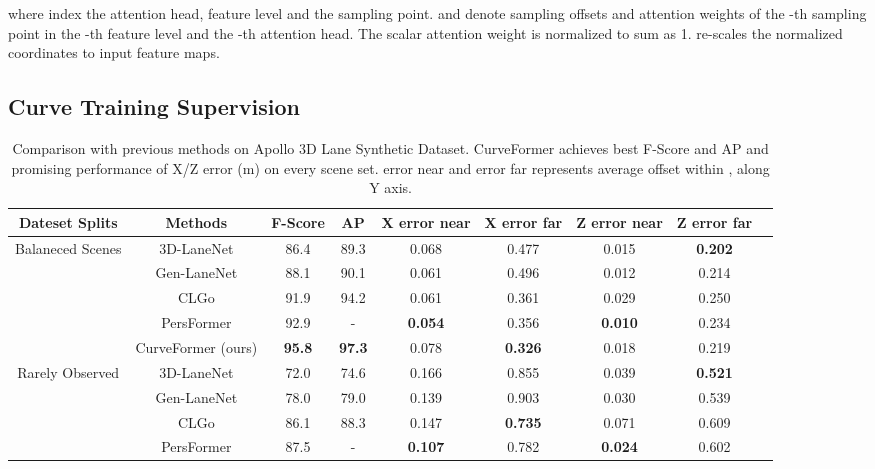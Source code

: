 \documentclass[letterpaper, 10 pt, conference]{ieeeconf}
\begin{document}
where  index the attention head, feature level and the sampling point.  and  denote sampling offsets and attention weights of the -th sampling point in the -th feature level and the -th attention head. The scalar attention weight  is normalized to sum as 1.  re-scales the normalized coordinates to input feature maps.


\subsection{Curve Training Supervision}


\begin{table*}[t]
\centering
\begin{scriptsize}
    \caption{Comparison with previous methods on Apollo 3D Lane Synthetic Dataset. CurveFormer achieves best F-Score and AP and promising performance of X/Z error (m) on every scene set. error near and error far represents average offset within ,  along Y axis.}
    \label{tab:results-apollosim}
    \begin{tabular}{c|c|ccccccc}
    \toprule
    Dateset Splits & Methods & F-Score & AP & X error near & X error far & Z error near & Z error far \\
      \midrule
      \multicolumn{1}{c|}{\multirow{5}{5em}{Balaneced Scenes}}
     & 3D-LaneNet\cite{garnett20193d}   & 86.4 & 89.3 & 0.068 & 0.477 & 0.015 &  \textbf{0.202} \\
     & Gen-LaneNet\cite{guo2020gen}  & 88.1 & 90.1 & 0.061 & 0.496 & 0.012 & 0.214 \\
     & CLGo\cite{liu2022learning}         & 91.9 & 94.2 & 0.061 & 0.361 & 0.029 & 0.250 \\
     & PersFormer\cite{chen2022persformer}   & 92.9 & - &  \textbf{0.054} & 0.356 &  \textbf{0.010} & 0.234 \\
     & CurveFormer (ours) &  \textbf{95.8} &  \textbf{97.3} & 0.078 &  \textbf{0.326} & 0.018 & 0.219 \\
      \midrule
      \multicolumn{1}{c|}{\multirow{5}{5em}{Rarely Observed}} 
      & 3D-LaneNet\cite{garnett20193d}   & 72.0 & 74.6 & 0.166 & 0.855 & 0.039 & \textbf{0.521} \\
      & Gen-LaneNet\cite{guo2020gen}  & 78.0 & 79.0 & 0.139 & 0.903 & 0.030 & 0.539 \\
      & CLGo\cite{liu2022learning}         & 86.1 & 88.3 & 0.147 & \textbf{0.735} & 0.071 & 0.609 \\
      & PersFormer\cite{chen2022persformer}   & 87.5 & - & \textbf{0.107} & 0.782 & \textbf{0.024} & 0.602 \\

\end{tabular}
\end{scriptsize}
\end{table*}
\end{document}
